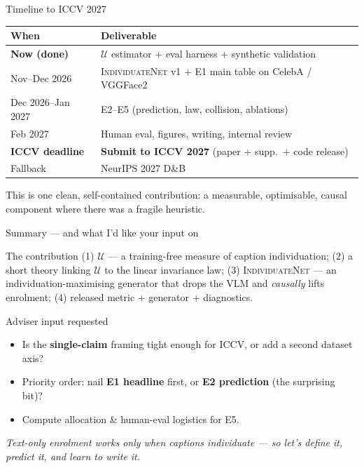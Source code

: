 \documentclass[aspectratio=169,10pt]{beamer}
\newcommand{\U}{\mathcal{U}}
\newcommand{\method}{\textsc{IndividuateNet}}
\newcommand{\good}[1]{\textcolor{green!55!black}{#1}}
\begin{document}
\begin{frame}{Timeline to ICCV 2027}
  \small
  \begin{tabular}{@{}ll@{}}
    \toprule
    When & Deliverable \\
    \midrule
    \textbf{Now (done)} & \good{$\U$ estimator + eval harness + synthetic validation} \\
    Nov--Dec 2026 & \method{} v1 + E1 main table on CelebA / VGGFace2 \\
    Dec 2026--Jan 2027 & E2--E5 (prediction, law, collision, ablations) \\
    Feb 2027 & Human eval, figures, writing, internal review \\
    \textbf{ICCV deadline} & \textbf{Submit to ICCV 2027} (paper + supp.\ + code release) \\
    Fallback & NeurIPS 2027 D\&B \\
    \bottomrule
  \end{tabular}
  \vspace{0.8em}

  \footnotesize This is one clean, self-contained contribution: a measurable, optimisable, causal
  component where there was a fragile heuristic.
\end{frame}

\begin{frame}{Summary --- and what I'd like your input on}
  \begin{block}{The contribution}
    (1) $\U$ --- a training-free measure of caption individuation;\;
    (2) a short theory linking $\U$ to the linear invariance law;\;
    (3) \method{} --- an individuation-maximising generator that drops the VLM and
    \emph{causally} lifts enrolment;\;
    (4) released metric + generator + diagnostics.
  \end{block}
  \begin{block}{Adviser input requested}
    \begin{itemize}
      \item Is the \textbf{single-claim} framing tight enough for ICCV, or add a second dataset axis?
      \item Priority order: nail \textbf{E1 headline} first, or \textbf{E2 prediction} (the surprising bit)?
      \item Compute allocation \& human-eval logistics for E5.
    \end{itemize}
  \end{block}
  \vspace{0.3em}
  \centering\itshape\small
  Text-only enrolment works only when captions individuate --- so let's define it, predict it, and learn to write it.
\end{frame}
\end{document}
